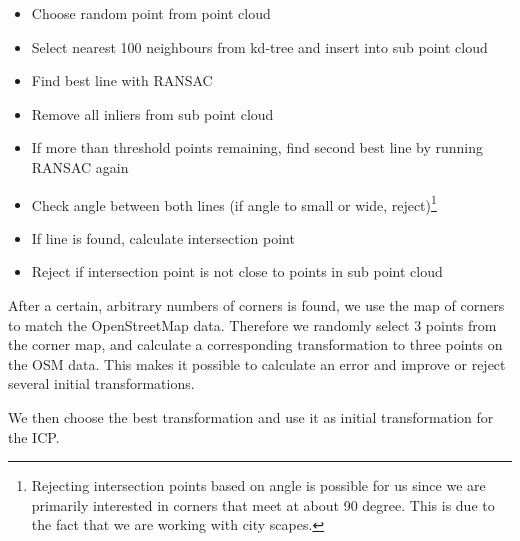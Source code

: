 \documentclass[10pt,twocolumn,letterpaper]{article}
\begin{document}
\begin{itemize}
    \item Choose random point from point cloud
    \item Select nearest 100 neighbours from kd-tree and insert into sub point cloud
    \item Find best line with RANSAC
    \item Remove all inliers from sub point cloud
    \item If more than threshold points remaining, find second best line by running RANSAC again
    \item Check angle between both lines (if angle to small or wide, reject)\footnote{Rejecting intersection points based on angle is possible for us since we are primarily interested in corners that meet at about 90 degree. This is due to the fact that we are working with city scapes.}
    \item If line is found, calculate intersection point
    \item Reject if intersection point is not close to points in sub point cloud
\end{itemize} 

After a certain, arbitrary numbers of corners is found, we use the map of corners to match the OpenStreetMap data. Therefore we randomly select 3 points from the corner map, and calculate a corresponding transformation to three points on the OSM data. This makes it possible to calculate an error and improve or reject several initial transformations.

We then choose the best transformation and use it as initial transformation for the ICP.

{\small


}
\end{document}
